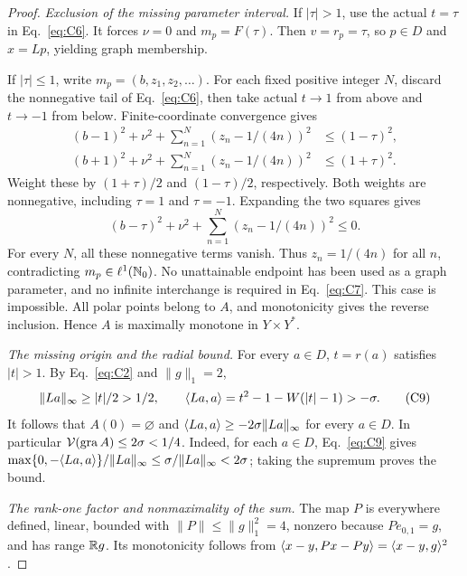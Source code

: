 \begin{proof}
\noindent\textit{Exclusion of the missing parameter interval.}
\label{sec:C4}
If $|\tau|>1$, use the actual $t=\tau$ in Eq.~\eqref{eq:C6}. It forces
$\nu=0$ and $m_p=F(\tau)$. Then $v=r_p=\tau$, so $p\in D$ and $x=Lp$,
yielding graph membership.

If $|\tau|\le1$, write $m_p=(b,z_1,z_2,\ldots)$. For each fixed positive
integer $N$, discard the nonnegative tail of Eq.~\eqref{eq:C6}, then
take actual $t\to1$ from above and $t\to-1$ from below.
Finite-coordinate convergence gives
\begin{equation}
\begin{aligned}
(b-1)^2+\nu^2+\sum_{n=1}^N(z_n-1/(4n))^2&\le(1-\tau)^2,\\
(b+1)^2+\nu^2+\sum_{n=1}^N(z_n-1/(4n))^2&\le(1+\tau)^2.
\end{aligned}
\tag{C7}\label{eq:C7}
\end{equation}
Weight these by $(1+\tau)/2$ and $(1-\tau)/2$, respectively. Both
weights are nonnegative, including $\tau=1$ and $\tau=-1$. Expanding
the two squares gives
\begin{equation}
(b-\tau)^2+\nu^2+\sum_{n=1}^N(z_n-1/(4n))^2\le0.
\tag{C8}\label{eq:C8}
\end{equation}
For every $N$, all these nonnegative terms vanish. Thus $z_n=1/(4n)$ for
all $n$, contradicting $m_p\in\ell^1(\mathbb N_0)$. No unattainable endpoint
has been used as a graph parameter, and no infinite interchange is required in
Eq.~\eqref{eq:C7}. This case is impossible. All polar points belong to
$A$, and monotonicity gives the reverse inclusion. Hence $A$ is maximally
monotone in $Y\times Y^*$.

\noindent\textit{The missing origin and the radial bound.}
\label{sec:C5}
For every $a\in D$, $t=r(a)$ satisfies $|t|>1$. By Eq.~\eqref{eq:C2}
and $\|g\|_1=2$,
\begin{equation}
\|La\|_\infty\ge|t|/2>1/2,\qquad
\langle La,a\rangle=t^2-1-W(|t|-1)>-\sigma.
\tag{C9}\label{eq:C9}
\end{equation}
It follows that $A(0)=\varnothing$ and
$\langle La,a\rangle\ge-2\sigma\|La\|_\infty$ for every $a\in D$.
In particular $\mathcal V(\operatorname{gra} A)\le2\sigma<1/4$.
Indeed, for each $a\in D$, Eq.~\eqref{eq:C9} gives
$\max\{0,-\langle La,a\rangle\}/\|La\|_\infty
\le\sigma/\|La\|_\infty<2\sigma$; taking the supremum proves the bound.

\noindent\textit{The rank-one factor and nonmaximality of the sum.}
\label{sec:C6}
The map $P$ is everywhere defined, linear, bounded with
$\|P\|\le\|g\|_1^2=4$, nonzero because $Pe_{0,1}=g$, and has range $\mathbb R g$.
Its monotonicity follows from $\langle x-y,Px-Py\rangle=\langle x-y,g\rangle^2$.


\end{proof}
